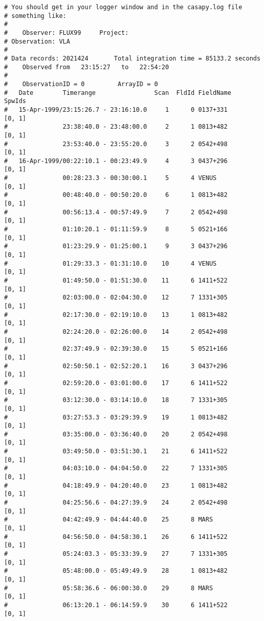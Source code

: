 \begin{verbatim}
# You should get in your logger window and in the casapy.log file
# something like:
#
#    Observer: FLUX99     Project:   
# Observation: VLA
# 
# Data records: 2021424       Total integration time = 85133.2 seconds
#    Observed from   23:15:27   to   22:54:20
# 
#    ObservationID = 0         ArrayID = 0
#   Date        Timerange                Scan  FldId FieldName      SpwIds
#   15-Apr-1999/23:15:26.7 - 23:16:10.0     1      0 0137+331       [0, 1]
#               23:38:40.0 - 23:48:00.0     2      1 0813+482       [0, 1]
#               23:53:40.0 - 23:55:20.0     3      2 0542+498       [0, 1]
#   16-Apr-1999/00:22:10.1 - 00:23:49.9     4      3 0437+296       [0, 1]
#               00:28:23.3 - 00:30:00.1     5      4 VENUS          [0, 1]
#               00:48:40.0 - 00:50:20.0     6      1 0813+482       [0, 1]
#               00:56:13.4 - 00:57:49.9     7      2 0542+498       [0, 1]
#               01:10:20.1 - 01:11:59.9     8      5 0521+166       [0, 1]
#               01:23:29.9 - 01:25:00.1     9      3 0437+296       [0, 1]
#               01:29:33.3 - 01:31:10.0    10      4 VENUS          [0, 1]
#               01:49:50.0 - 01:51:30.0    11      6 1411+522       [0, 1]
#               02:03:00.0 - 02:04:30.0    12      7 1331+305       [0, 1]
#               02:17:30.0 - 02:19:10.0    13      1 0813+482       [0, 1]
#               02:24:20.0 - 02:26:00.0    14      2 0542+498       [0, 1]
#               02:37:49.9 - 02:39:30.0    15      5 0521+166       [0, 1]
#               02:50:50.1 - 02:52:20.1    16      3 0437+296       [0, 1]
#               02:59:20.0 - 03:01:00.0    17      6 1411+522       [0, 1]
#               03:12:30.0 - 03:14:10.0    18      7 1331+305       [0, 1]
#               03:27:53.3 - 03:29:39.9    19      1 0813+482       [0, 1]
#               03:35:00.0 - 03:36:40.0    20      2 0542+498       [0, 1]
#               03:49:50.0 - 03:51:30.1    21      6 1411+522       [0, 1]
#               04:03:10.0 - 04:04:50.0    22      7 1331+305       [0, 1]
#               04:18:49.9 - 04:20:40.0    23      1 0813+482       [0, 1]
#               04:25:56.6 - 04:27:39.9    24      2 0542+498       [0, 1]
#               04:42:49.9 - 04:44:40.0    25      8 MARS           [0, 1]
#               04:56:50.0 - 04:58:30.1    26      6 1411+522       [0, 1]
#               05:24:03.3 - 05:33:39.9    27      7 1331+305       [0, 1]
#               05:48:00.0 - 05:49:49.9    28      1 0813+482       [0, 1]
#               05:58:36.6 - 06:00:30.0    29      8 MARS           [0, 1]
#               06:13:20.1 - 06:14:59.9    30      6 1411+522       [0, 1]

\end{verbatim}
